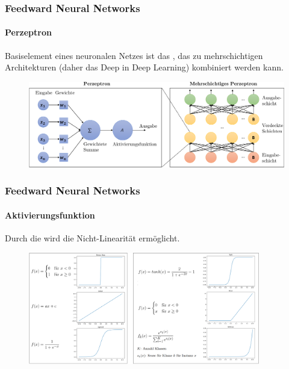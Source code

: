 \documentclass[german,aspectratio=169]{beamer}
\begin{document}
\begin{frame}
	\frametitle{Feedward Neural Networks}
	\framesubtitle{Perzeptron}
	Basiselement eines neuronalen Netzes ist das , das zu mehrschichtigen Architekturen (daher das Deep in Deep Learning) kombiniert werden kann.
	\begin{figure}
		\includegraphics[width=1.0\textwidth]{perzeptron.pdf}
	\end{figure}
\end{frame}

\begin{frame}
	\frametitle{Feedward Neural Networks}
	\framesubtitle{Aktivierungsfunktion}
	Durch die  wird die Nicht-Linearität ermöglicht.
	\begin{figure}
		\includegraphics[width=0.9\textwidth]{activations.png}
	\end{figure}
\end{frame}
\end{document}
